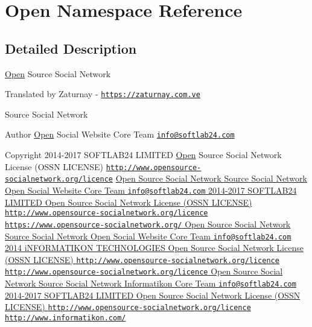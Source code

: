 \hypertarget{namespace_open}{}\section{Open Namespace Reference}
\label{namespace_open}


\subsection{Detailed Description}
\hyperlink{namespace_open}{Open} Source Social Network

Translated by Zaturnay -\/ \href{https://zaturnay.com.ve}{\tt https\+://zaturnay.\+com.\+ve}

Source Social Network \begin{DoxyAuthor}{Author}
\hyperlink{namespace_open}{Open} Social Website Core Team \href{mailto:info@softlab24.com}{\tt info@softlab24.\+com} 
\end{DoxyAuthor}
\begin{DoxyCopyright}{Copyright}
2014-\/2017 S\+O\+F\+T\+L\+A\+B24 L\+I\+M\+I\+T\+ED  \hyperlink{namespace_open}{Open} Source Social Network License (O\+S\+SN L\+I\+C\+E\+N\+SE) \href{http://www.opensource-socialnetwork.org/licence}{\tt http\+://www.\+opensource-\/socialnetwork.\+org/licence} \hyperlink{}{Open Source Social Network  Source Social Network  Open Social Website Core Team \href{mailto:info@softlab24.com}{\tt info@softlab24.\+com}  2014-\/2017 S\+O\+F\+T\+L\+A\+B24 L\+I\+M\+I\+T\+ED  Open Source Social Network License (O\+S\+SN L\+I\+C\+E\+N\+SE) \href{http://www.opensource-socialnetwork.org/licence}{\tt http\+://www.\+opensource-\/socialnetwork.\+org/licence}  \href{https://www.opensource-socialnetwork.org/}{\tt https\+://www.\+opensource-\/socialnetwork.\+org/} Open Source Social Network  Source Social Network  Open Social Website Core Team \href{mailto:info@softlab24.com}{\tt info@softlab24.\+com}  2014 i\+N\+F\+O\+R\+M\+A\+T\+I\+K\+ON T\+E\+C\+H\+N\+O\+L\+O\+G\+I\+ES  Open Source Social Network License (O\+S\+SN L\+I\+C\+E\+N\+SE) \href{http://www.opensource-socialnetwork.org/licence}{\tt http\+://www.\+opensource-\/socialnetwork.\+org/licence}  \href{http://www.opensource-socialnetwork.org/licence}{\tt http\+://www.\+opensource-\/socialnetwork.\+org/licence} Open Source Social Network  Source Social Network  Informatikon Core Team \href{mailto:info@softlab24.com}{\tt info@softlab24.\+com}  2014-\/2017 S\+O\+F\+T\+L\+A\+B24 L\+I\+M\+I\+T\+ED  Open Source Social Network License (O\+S\+SN L\+I\+C\+E\+N\+SE) \href{http://www.opensource-socialnetwork.org/licence}{\tt http\+://www.\+opensource-\/socialnetwork.\+org/licence}  \href{http://www.informatikon.com/}{\tt http\+://www.\+informatikon.\+com/} }
\end{DoxyCopyright}
